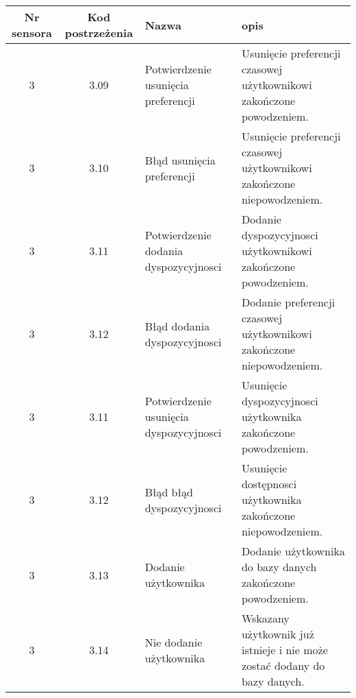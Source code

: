 \begin{tabular}{c|c|p{3cm}|p{5cm}}
Nr sensora & Kod postrzeżenia & Nazwa & opis\\
\hline
3 & 3.09 & Potwierdzenie  usunięcia preferencji &  Usunięcie preferencji czasowej użytkownikowi zakończone powodzeniem.\\
3 & 3.10 & Błąd usunięcia preferencji &  Usunięcie preferencji czasowej użytkownikowi zakończone niepowodzeniem.\\
3 & 3.11 & Potwierdzenie dodania dyspozycyjnosci &  Dodanie dyspozycyjnosci użytkownikowi zakończone powodzeniem.\\
3 & 3.12 & Błąd dodania dyspozycyjnosci &  Dodanie preferencji czasowej użytkownikowi zakończone niepowodzeniem.\\
3 & 3.11 & Potwierdzenie usunięcia dyspozycyjnosci &  Usunięcie dyspozycyjnosci użytkownika zakończone powodzeniem.\\
3 & 3.12 & Błąd błąd dyspozycyjnosci &  Usunięcie dostępnosci użytkownika zakończone niepowodzeniem.\\
3 & 3.13 & Dodanie użytkownika & Dodanie użytkownika do bazy danych zakończone powodzeniem.\\
3 & 3.14 & Nie dodanie użytkownika & Wskazany użytkownik już istnieje i nie może zostać dodany do bazy danych.\\
\end{tabular}
